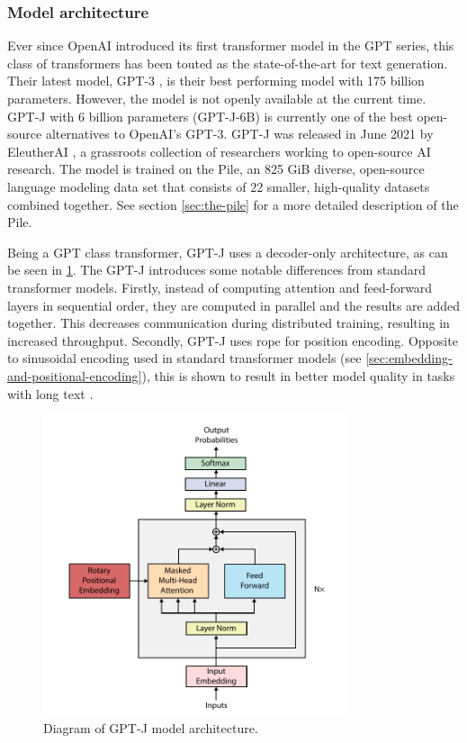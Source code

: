 \subsubsection{Model architecture}
\label{sec:architecture}
Ever since OpenAI introduced its first transformer model in the GPT series, this class of transformers has been touted as the state-of-the-art for text generation. Their latest model, GPT-3 \cite{brown2020language}, is their best performing model with 175 billion parameters. However, the model is not openly available at the current time. GPT-J \cite{gpt-j} with 6 billion parameters (GPT-J-6B) is currently one of the best open-source alternatives to OpenAI's GPT-3. GPT-J was released in June 2021 by EleutherAI \cite{elutherai}, a grassroots collection of researchers working to open-source AI research. The model is trained on the Pile, an 825 GiB diverse, open-source language modeling data set that consists of 22 smaller, high-quality datasets combined together. See section \cref{sec:the-pile} for a more detailed description of the Pile.

Being a GPT class transformer, GPT-J uses a decoder-only architecture, as can be seen in \cref{fig:gpt-j-architecture}. The GPT-J introduces some notable differences from standard transformer models. Firstly, instead of computing attention and feed-forward layers in sequential order, they are computed in parallel and the results are added together. This decreases communication during distributed training, resulting in increased throughput. Secondly, GPT-J uses \acrfull{rope} \cite{su2021roformer} for position encoding. Opposite to sinusoidal encoding used in standard transformer models (see \cref{sec:embedding-and-positional-encoding}), this is shown to result in better model quality in tasks with long text \cite{su2021roformer}.

\begin{figure}[htbp]
    \centering
    \includegraphics[width=0.8\textwidth]{figures/gpt-j_architecture.pdf}
    \caption{Diagram of GPT-J model architecture.}
    \label{fig:gpt-j-architecture}
\end{figure}

